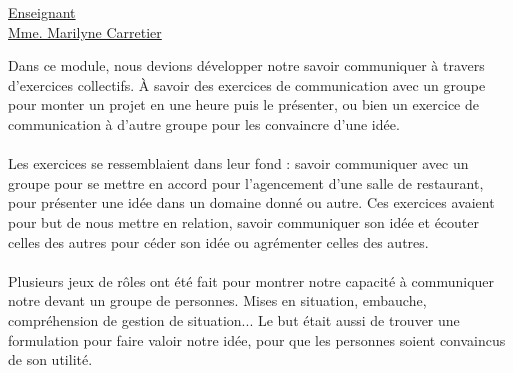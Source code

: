 \renewcommand{\figurename}{}

\vspace*{0.2cm}
      \large
      \href{\@orientadorPagina}{\color{black}Enseignant\\Mme. Marilyne Carretier}\\
\vspace*{0.5cm}

Dans ce module, nous devions développer notre savoir communiquer à travers d'exercices collectifs. À savoir des exercices de communication avec un groupe pour monter un projet en une heure puis le présenter, ou bien un exercice de communication à d'autre groupe pour les convaincre d'une idée.
\\ \\
Les exercices se ressemblaient dans leur fond : savoir communiquer avec un groupe pour se mettre en accord pour l'agencement d'une salle de restaurant, pour présenter une idée dans un domaine donné ou autre. Ces exercices avaient pour but de nous mettre en relation, savoir communiquer son idée et écouter celles des autres pour céder son idée ou agrémenter celles des autres.
\\ \\
Plusieurs jeux de rôles ont été fait pour montrer notre capacité à communiquer notre devant un groupe de personnes. Mises en situation, embauche, compréhension de gestion de situation... Le but était aussi de trouver une formulation pour faire valoir notre idée, pour que les personnes soient convaincus de son utilité.